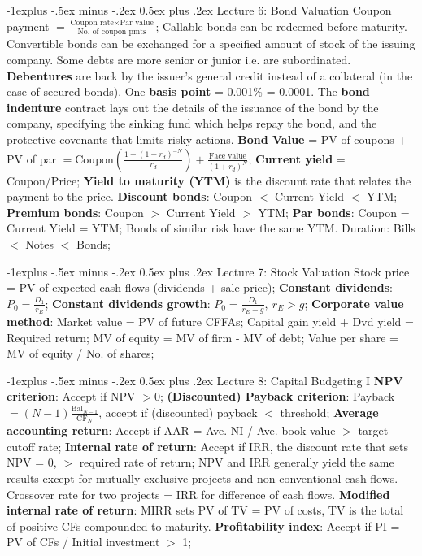 \documentclass[10pt,landscape]{article}
\makeatletter
\renewcommand{\subsection}{\@startsection{subsection}{2}{0mm}%
                                {-1explus -.5ex minus -.2ex}%
                                {0.5ex plus .2ex}%
                                {\normalfont\normalsize\bfseries}}
\makeatother
\begin{document}
\begin{multicols}{3}
\subsection{Lecture 6: Bond Valuation}
Coupon payment $= \frac{\text{Coupon rate} \times \text{Par value}}{\text{No.
	of coupon pmts}}$;
Callable bonds can be redeemed before maturity.
Convertible bonds can be exchanged for a specified amount of stock of the
	issuing company.
Some debts are more senior or junior i.e. are subordinated.
\textbf{Debentures} are back by the issuer's general credit instead of a
	collateral (in the case of secured bonds).
One \textbf{basis point} = 0.001\% = 0.0001.
The \textbf{bond indenture} contract lays out the details of the issuance of the bond by
	the company, specifying the sinking fund which helps repay the bond, and the
	protective covenants that limits risky actions.
\textbf{Bond Value} = PV of coupons + PV of par $= \text{Coupon} \left(
	\frac{1-(1+r_d)^{-N}}{r_d}\right) + \frac{\text{Face value}}{(1+r_d)^N}$;
\textbf{Current yield} = Coupon/Price;
\textbf{Yield to maturity (YTM)} is the discount rate that relates the payment
	to the price.
\textbf{Discount bonds}: Coupon $<$ Current Yield $<$ YTM;
\textbf{Premium bonds}: Coupon $>$ Current Yield $>$ YTM;
\textbf{Par bonds}: Coupon = Current Yield = YTM;
Bonds of similar risk have the same YTM.
Duration: Bills $<$ Notes $<$ Bonds;

\subsection{Lecture 7: Stock Valuation}
Stock price = PV of expected cash flows (dividends + sale price);
\textbf{Constant dividends}: $P_0 = \frac{D_1}{r_E}$;
\textbf{Constant dividends growth}: $P_0 = \frac{D_1}{r_E-g},\ r_E > g$;
\textbf{Corporate value method}: Market value = PV of future CFFAs;
Capital gain yield + Dvd yield = Required return;
MV of equity = MV of firm - MV of debt;
Value per share = MV of equity / No. of shares;

\subsection{Lecture 8: Capital Budgeting I}
\textbf{NPV criterion}: Accept if NPV $> 0$;
\textbf{(Discounted) Payback criterion}: Payback $=
	(N-1)\frac{\text{Bal}_{N-1}}{\text{CF}_N}$, accept if (discounted) payback
	$<$ threshold;
\textbf{Average accounting return}: Accept if AAR = Ave. NI / Ave. book value
	$>$ target cutoff rate;
\textbf{Internal rate of return}: Accept if IRR, the discount rate that sets
	NPV = 0, $>$ required rate of return;
NPV and IRR generally yield the same results except for mutually exclusive
	projects and non-conventional cash flows.
Crossover rate for two projects = IRR for difference of cash flows.
\textbf{Modified internal rate of return}: MIRR sets PV of TV = PV of costs, TV
	is the total of positive CFs compounded to maturity.
\textbf{Profitability index}: Accept if PI = PV of CFs / Initial investment $>$ 1;


\end{multicols}
\end{document}
